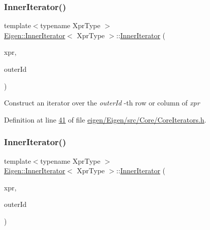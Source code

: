 \subsubsection{\texorpdfstring{Inner\+Iterator()}{InnerIterator()}\hspace{0.1cm}{\footnotesize\ttfamily [1/2]}}
{\footnotesize\ttfamily template$<$typename Xpr\+Type $>$ \\
\hyperlink{class_eigen_1_1_inner_iterator}{Eigen\+::\+Inner\+Iterator}$<$ Xpr\+Type $>$\+::\hyperlink{class_eigen_1_1_inner_iterator}{Inner\+Iterator} (\begin{DoxyParamCaption}\item[{const Xpr\+Type \&}]{xpr,  }\item[{const \hyperlink{namespace_eigen_a62e77e0933482dafde8fe197d9a2cfde}{Index} \&}]{outer\+Id }\end{DoxyParamCaption})\hspace{0.3cm}{\ttfamily [inline]}}

Construct an iterator over the {\itshape outer\+Id} -\/th row or column of {\itshape xpr} 

Definition at line \hyperlink{eigen_2_eigen_2src_2_core_2_core_iterators_8h_source_l00041}{41} of file \hyperlink{eigen_2_eigen_2src_2_core_2_core_iterators_8h_source}{eigen/\+Eigen/src/\+Core/\+Core\+Iterators.\+h}.

\mbox{\label{class_eigen_1_1_inner_iterator_abbcdcf4d5ecb4445654b7940204cb750}} 
\subsubsection{\texorpdfstring{Inner\+Iterator()}{InnerIterator()}\hspace{0.1cm}{\footnotesize\ttfamily [2/2]}}
{\footnotesize\ttfamily template$<$typename Xpr\+Type $>$ \\
\hyperlink{class_eigen_1_1_inner_iterator}{Eigen\+::\+Inner\+Iterator}$<$ Xpr\+Type $>$\+::\hyperlink{class_eigen_1_1_inner_iterator}{Inner\+Iterator} (\begin{DoxyParamCaption}\item[{const Xpr\+Type \&}]{xpr,  }\item[{const \hyperlink{namespace_eigen_a62e77e0933482dafde8fe197d9a2cfde}{Index} \&}]{outer\+Id }\end{DoxyParamCaption})\hspace{0.3cm}{\ttfamily [inline]}}

